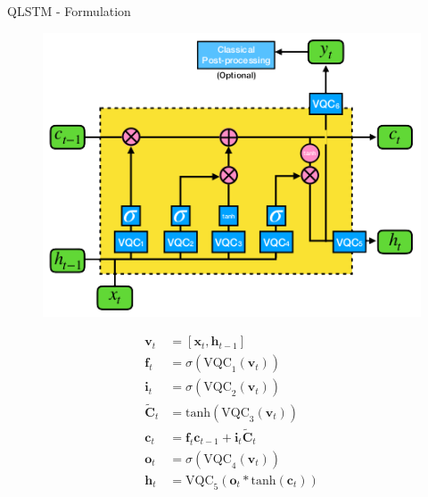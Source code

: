 \begin{frame}{QLSTM - Formulation}
	\begin{minipage}[c]{.55\linewidth}
		\begin{figure}[h]
			\includegraphics[width=\linewidth]{qlstm}
		\end{figure}
	\end{minipage}
	\begin{minipage}[c]{.35\linewidth}
		\begin{align*}
			\textbf{v}_t &= [\textbf{x}_t, \textbf{h}_{t-1}] \\
			\textbf{f}_t &= \sigma (\text{VQC}_1 (\textbf{v}_t )) \\
			\textbf{i}_t &= \sigma (\text{VQC}_2 (\textbf{v}_t )) \\
			\tilde{\textbf{C}}_t &= \text{tanh} (\text{VQC}_3 (\textbf{v}_t)) \\
			\textbf{c}_t &= \textbf{f}_t   \textbf{c}_{t-1} + \textbf{i}_t  \tilde{\textbf{C}}_t \\
			\textbf{o}_t &= \sigma (\text{VQC}_4 (\textbf{v}_t )) \\
			\textbf{h}_t &= \text{VQC}_5 (\textbf{o}_t  * \text{tanh}(\textbf{c}_t ))
		\end{align*}
	\end{minipage}

\end{frame}

